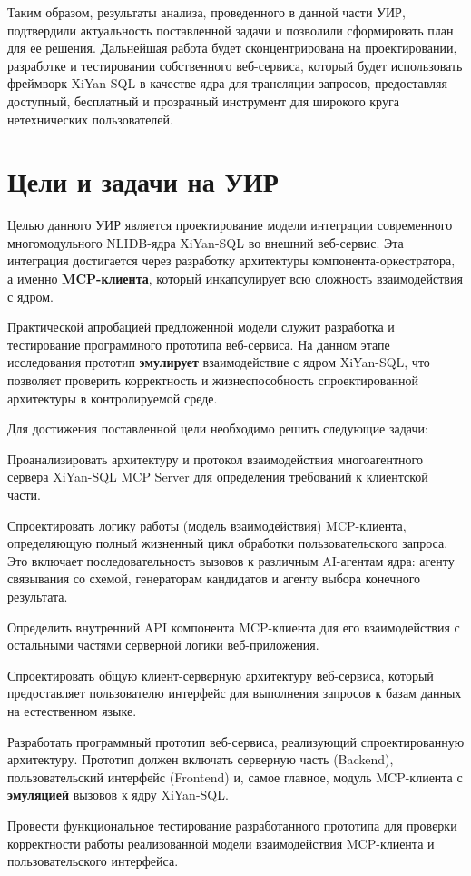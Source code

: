 Таким образом, результаты анализа, проведенного в данной части УИР, подтвердили актуальность
поставленной задачи и позволили сформировать план
для ее решения. Дальнейшая работа будет сконцентрирована на проектировании, разработке и
тестировании собственного веб-сервиса, который будет использовать фреймворк XiYan-SQL в качестве
ядра для трансляции запросов, предоставляя доступный, бесплатный и прозрачный инструмент для
широкого круга нетехнических пользователей.




\section{Цели и задачи на УИР}

Целью данного УИР является проектирование модели интеграции современного многомодульного
NLIDB-ядра XiYan-SQL во внешний веб-сервис. Эта интеграция достигается через разработку
архитектуры компонента-оркестратора, а именно \textbf{MCP-клиента}, который инкапсулирует
всю сложность взаимодействия с ядром.

Практической апробацией предложенной модели служит разработка и
тестирование программного прототипа веб-сервиса. На данном этапе исследования
прототип \textbf{эмулирует} взаимодействие с ядром XiYan-SQL, что позволяет проверить
корректность и жизнеспособность спроектированной архитектуры в контролируемой среде.

Для достижения поставленной цели необходимо решить следующие задачи:
\begin{compactenum}
      \item Проанализировать архитектуру и протокол взаимодействия многоагентного сервера
      XiYan-SQL MCP Server для определения требований к клиентской части.
      \item Спроектировать логику работы (модель взаимодействия) MCP-клиента,
      определяющую полный жизненный цикл обработки пользовательского запроса.
      Это включает последовательность вызовов к различным AI-агентам ядра: агенту связывания со
      схемой, генераторам кандидатов и агенту выбора конечного результата.
      \item Определить внутренний API компонента MCP-клиента для его взаимодействия с
      остальными частями серверной логики веб-приложения.
      \item Спроектировать общую клиент-серверную архитектуру веб-сервиса,
      который предоставляет пользователю интерфейс для выполнения запросов к
      базам данных на естественном языке.
      \item Разработать программный прототип веб-сервиса, реализующий спроектированную архитектуру.
      Прототип должен включать серверную часть (Backend), пользовательский интерфейс (Frontend) и,
      самое главное, модуль MCP-клиента с \textbf{эмуляцией} вызовов к ядру XiYan-SQL.
      \item Провести функциональное тестирование разработанного прототипа для проверки
      корректности работы реализованной модели взаимодействия MCP-клиента и
      пользовательского интерфейса.
\end{compactenum}
